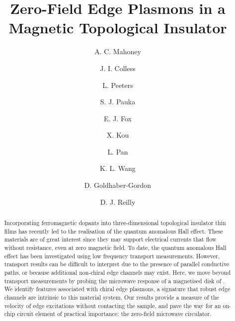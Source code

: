 \makeatletter\frontmatter@init\makeatother

\title{Zero-Field Edge Plasmons in a Magnetic Topological Insulator}

\author{A. C. Mahoney}
\author{J. I. Colless}
\author{L. Peeters}
\author{S. J. Pauka}
\author{E. J. Fox}
\author{X. Kou}
\author{L. Pan}
\author{K. L. Wang}
\author{D. Goldhaber-Gordon}
\author{D. J. Reilly}

\makeatletter
\begingroup
\@author@finish
\frontmatter@author@produce@script
\endgroup
\makeatother

\begin{abstract}
Incorporating ferromagnetic dopants into three-dimensional topological insulator thin films has recently led to the realisation of the quantum anomalous Hall effect. These materials are of great interest since they may support electrical currents that flow without resistance, even at zero magnetic field. To date, the quantum anomalous Hall effect has been investigated using low frequency transport measurements. However, transport results can be difficult to interpret due to the presence of parallel conductive paths, or because additional non-chiral edge channels may exist. Here, we move beyond transport measurements by probing the microwave response of a magnetised disk of . We identify features associated with chiral edge plasmons, a signature that robust edge channels are intrinsic to this material system. Our results provide a measure of the velocity of edge excitations without contacting the sample, and pave the way for an on-chip circuit element of practical importance: the zero-field microwave circulator.
\end{abstract}

